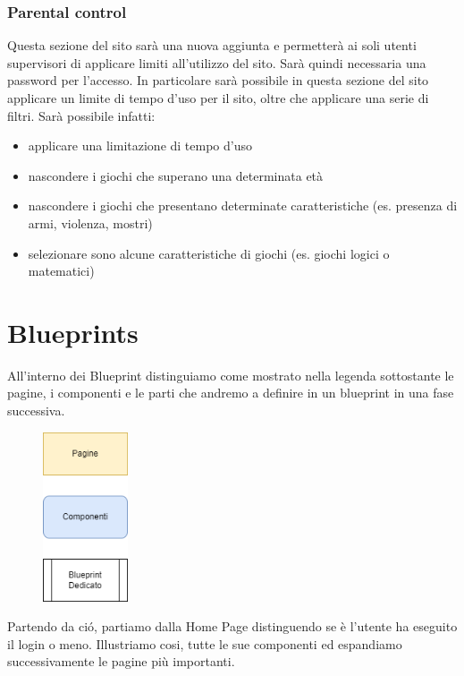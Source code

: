 \documentclass[../Report.tex]{subfiles}
\begin{document}
    \subsubsection{Parental control}
    Questa sezione del sito sarà una nuova aggiunta e permetterà ai soli utenti supervisori di applicare limiti all'utilizzo del sito. Sarà quindi necessaria una password per l'accesso. In particolare sarà possibile in questa sezione del sito applicare un limite di tempo d'uso per il sito, oltre che applicare una serie di filtri. Sarà possibile infatti:
    \begin{itemize}
        \item applicare una limitazione di tempo d'uso 
        \item nascondere i giochi che superano una determinata età
        \item nascondere i giochi che presentano determinate caratteristiche (es. presenza di armi, violenza, mostri)
        \item selezionare sono alcune caratteristiche di giochi (es. giochi logici o matematici)
    \end{itemize}
    
    \section{Blueprints}
    All'interno dei Blueprint distinguiamo come mostrato nella legenda sottostante le pagine, i componenti e le parti che andremo a definire in un blueprint in una fase successiva.
    \begin{figure}[H]
        \includegraphics[height=5cm]{Legenda.png}
        \centering
    \end{figure}

    Partendo da ció, partiamo dalla Home Page distinguendo se è l'utente ha eseguito il login o meno.
    Illustriamo cosi, tutte le sue componenti ed espandiamo successivamente le pagine più importanti.
\end{document}
